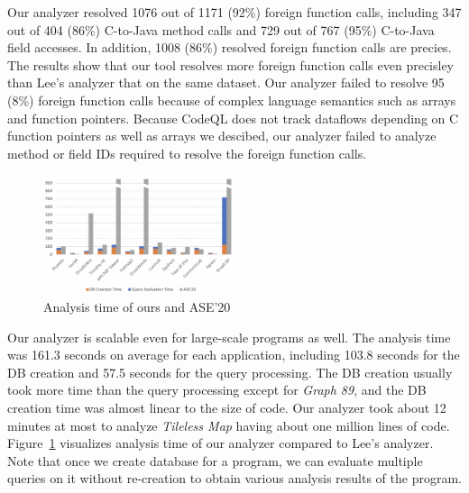 Our analyzer resolved 1076 out of 1171 (92\%) foreign function calls, including
347 out of 404 (86\%) C-to-Java method calls and 729 out of 767 (95\%)
C-to-Java field accesses. In addition, 1008 (86\%) resolved foreign function
calls are precies. The results show that our tool resolves more foreign
function calls even precisley than Lee's analyzer that  on the same
dataset. Our analyzer failed to resolve 95 (8\%) foreign function calls because
of complex language semantics such as arrays and function pointers. Because
CodeQL does not track dataflows depending on C function pointers as well as
arrays we descibed, our analyzer failed to analyze method or field IDs required
to resolve the foreign function calls.

\begin{figure}[t]
  \centering
  \vspace{2mm}
  \includegraphics[width=0.5\textwidth]{img/graph}
  \vspace*{-1.5em}
  \caption{Analysis time of ours and ASE'20}
  \label{fig:graph}
\vspace*{-.5em}
\end{figure}

Our analyzer is scalable even for large-scale programs as well. The analysis
time was 161.3 seconds on average for each application, including 103.8 seconds
for the DB creation and 57.5 seconds for the query processing. The DB creation
usually took more time than the query processing except for {\it Graph 89}, and
the DB creation time was almost linear to the size of code. Our analyzer took
about 12 minutes at most to analyze {\it Tileless Map} having about one million
lines of code. Figure~\ref{fig:graph} visualizes analysis time of our analyzer
compared to Lee's analyzer.   Note
that once we create database for a program, we can evaluate multiple queries on
it without re-creation to obtain various analysis results of the program.



